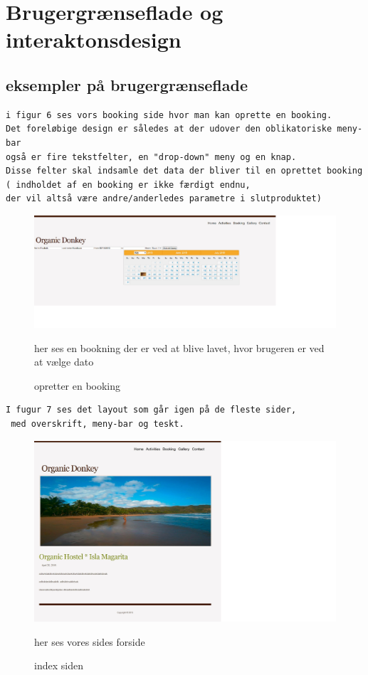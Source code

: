 \documentclass[12pt,a4paper]{article}
\begin{document}
\section{Brugergrænseflade og interaktonsdesign}

\subsection{eksempler på brugergrænseflade}
\begin{verbatim}
i figur 6 ses vors booking side hvor man kan oprette en booking. 
Det foreløbige design er således at der udover den oblikatoriske meny-bar 
også er fire tekstfelter, en "drop-down" meny og en knap.
Disse felter skal indsamle det data der bliver til en oprettet booking 
( indholdet af en booking er ikke færdigt endnu, 
der vil altså være andre/anderledes parametre i slutproduktet)  
\end{verbatim}
\begin{figure}[H]
\centering
\includegraphics[scale=0.5] {brugergransefladebilled1.jpg}
\caption{opretter en booking}
her ses en bookning der er ved at blive lavet, hvor brugeren er ved at vælge dato
\end{figure}
\begin{verbatim}
I fugur 7 ses det layout som går igen på de fleste sider,
 med overskrift, meny-bar og teskt.
\end{verbatim}
\begin{figure}[H]
\centering
\includegraphics[scale=0.6] {brugergransefladebilled2.jpg}
\caption{index siden}
her ses vores sides forside 
\end{figure}
\end{document}

